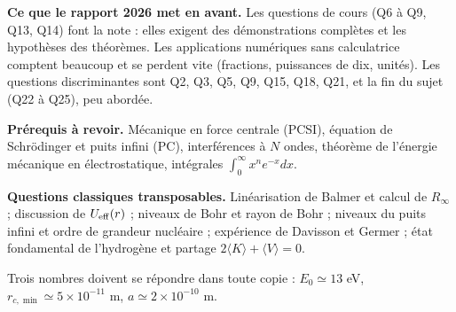 \documentclass[11pt,a4paper]{article}
\begin{document}
\textbf{Ce que le rapport 2026 met en avant.} Les questions de cours (Q6 à Q9, Q13, Q14) font la note : elles exigent des démonstrations complètes et les hypothèses des théorèmes. Les applications numériques sans calculatrice comptent beaucoup et se perdent vite (fractions, puissances de dix, unités). Les questions discriminantes sont Q2, Q3, Q5, Q9, Q15, Q18, Q21, et la fin du sujet (Q22 à Q25), peu abordée.

\textbf{Prérequis à revoir.} Mécanique en force centrale (PCSI), équation de Schrödinger et puits infini (PC), interférences à \(N\) ondes, théorème de l'énergie mécanique en électrostatique, intégrales \(\int_0^\infty x^ne^{-x}dx\).

\textbf{Questions classiques transposables.} Linéarisation de Balmer et calcul de \(R_\infty\) ; discussion de \(U_{\rm eff}(r)\) ; niveaux de Bohr et rayon de Bohr ; niveaux du puits infini et ordre de grandeur nucléaire ; expérience de Davisson et Germer ; état fondamental de l'hydrogène et partage \(2\langle K\rangle+\langle V\rangle=0\).

Trois nombres doivent se répondre dans toute copie : \(E_0\simeq13\) eV, \(r_{c,\min}\simeq5\times10^{-11}\) m, \(a\simeq2\times10^{-10}\) m.
\end{document}
